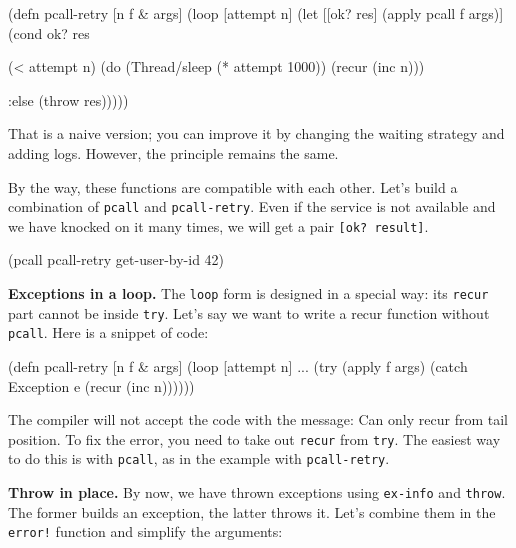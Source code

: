 \else

\begin{english}
  \begin{clojure}
(defn pcall-retry [n f & args]
  (loop [attempt n]
    (let [[ok? res] (apply pcall f args)]
      (cond
        ok? res

        (< attempt n)
        (do (Thread/sleep (* attempt 1000))
            (recur (inc n)))

        :else (throw res)))))
  \end{clojure}
\end{english}

\fi

That is a naive version; you can improve it by changing the waiting strategy and adding logs. However, the principle remains the same.

By the way, these functions are compatible with each other. Let's build a combination of \verb|pcall| and \verb|pcall-retry|. Even if the service is not available and we have knocked on it many times, we will get a pair \verb|[ok? result]|.

\begin{english}
  \begin{clojure}
(pcall pcall-retry get-user-by-id 42)
  \end{clojure}
\end{english}

\textbf{ Exceptions in a loop.} The \verb|loop| form is designed in a special way: its \verb|recur| part cannot be inside \verb|try|. Let's say we want to write a recur function without \verb|pcall|. Here is a snippet of code:


\begin{english}
  \begin{clojure}
(defn pcall-retry [n f & args]
  (loop [attempt n]
    ...
    (try
      (apply f args)
      (catch Exception e
        (recur (inc n))))))
  \end{clojure}
\end{english}

The compiler will not accept the code with the message: Can only recur from tail position. To fix the error, you need to take out \verb|recur| from \verb|try|. The easiest way to do this is with \verb|pcall|, as in the example with \verb|pcall-retry|.

\textbf{Throw in place.} By now, we have thrown exceptions using \verb|ex-info| and \verb|throw|. The former builds an exception, the latter throws it. Let's combine them in the \verb|error!| function and simplify the arguments:

